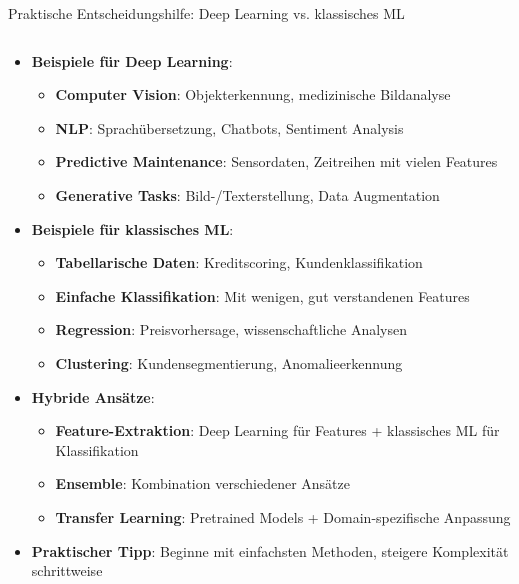 \documentclass[aspectratio=1610, xcolor=dvipsnames, 9pt]{beamer}
\begin{document}
\begin{frame}{Praktische Entscheidungshilfe: Deep Learning vs. klassisches ML}
  \begin{columns}
    \begin{column}{1\textwidth}
      \begin{itemize}
        \item \textbf{Beispiele für Deep Learning}:
        \begin{itemize}
          \item \textbf{Computer Vision}: Objekterkennung, medizinische Bildanalyse
          \item \textbf{NLP}: Sprachübersetzung, Chatbots, Sentiment Analysis
          \item \textbf{Predictive Maintenance}: Sensordaten, Zeitreihen mit vielen Features
          \item \textbf{Generative Tasks}: Bild-/Texterstellung, Data Augmentation
        \end{itemize}
        \item \textbf{Beispiele für klassisches ML}:
        \begin{itemize}
          \item \textbf{Tabellarische Daten}: Kreditscoring, Kundenklassifikation
          \item \textbf{Einfache Klassifikation}: Mit wenigen, gut verstandenen Features
          \item \textbf{Regression}: Preisvorhersage, wissenschaftliche Analysen
          \item \textbf{Clustering}: Kundensegmentierung, Anomalieerkennung
        \end{itemize}
        \item \textbf{Hybride Ansätze}:
        \begin{itemize}
          \item \textbf{Feature-Extraktion}: Deep Learning für Features + klassisches ML für Klassifikation
          \item \textbf{Ensemble}: Kombination verschiedener Ansätze
          \item \textbf{Transfer Learning}: Pretrained Models + Domain-spezifische Anpassung
        \end{itemize}
        \item \textbf{Praktischer Tipp}: Beginne mit einfachsten Methoden, steigere Komplexität schrittweise
      \end{itemize}
    \end{column}
  \end{columns}
\end{frame}
\end{document}
